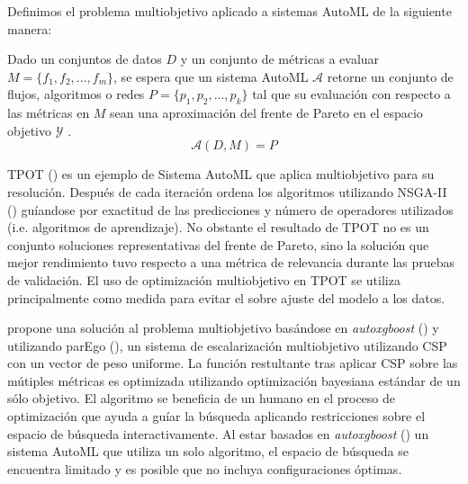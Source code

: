 Definimos el problema multiobjetivo aplicado a sistemas AutoML de la siguiente manera:
\begin{definition}\label{background:def:moo-automl-problem}
    Dado un conjuntos de datos $D$ y  un conjunto de m\'etricas a evaluar $M = \{f_1, f_2, ...,f_m\}$, se espera que  un sistema AutoML $\mathcal{A}$ retorne un conjunto de flujos, algoritmos o redes $P = \{p_1, p_2, ..., p_k\}$ tal que su evaluaci\'on con respecto a las m\'etricas en $M$ sean una aproximaci\'on del frente de Pareto en el espacio objetivo $\mathcal{Y}$ .
    \begin{equation*}
        \mathcal{A}(D, M) = P  
    \end{equation*}
\end{definition}

TPOT (\cite{pmlr-v64-olson_tpot_2016}) es un ejemplo de Sistema AutoML que aplica multiobjetivo para su resoluci\'on. Despu\'es de cada iteraci\'on ordena los algoritmos utilizando NSGA-II (\cite{deb2002fast}) gu\'iandose por exactitud de las predicciones y n\'umero de operadores utilizados (i.e. algoritmos de aprendizaje). No obstante el resultado de TPOT no es un conjunto soluciones representativas del frente de Pareto, sino la soluci\'on que mejor rendimiento tuvo respecto a una m\'etrica de relevancia durante las pruebas de validaci\'on. El uso de optimizaci\'on multiobjetivo en TPOT se utiliza principalmente como medida para evitar el sobre ajuste del modelo a los datos.

\cite{pfisterer2019multi} propone una soluci\'on al problema multiobjetivo bas\'andose en \textit{autoxgboost} (\cite{thomas2018automatic}) y utilizando  parEgo (\cite{knowles2006parego}), un sistema de escalarizaci\'on multiobjetivo utilizando CSP con un vector de peso uniforme. La funci\'on restultante tras aplicar CSP sobre las m\'utiples m\'etricas  es optimizada utilizando optimizaci\'on bayesiana est\'andar de un s\'olo objetivo.
El algoritmo se beneficia de un humano en el proceso de optimizaci\'on que ayuda a gu\'iar la b\'usqueda aplicando restricciones sobre el espacio de b\'usqueda interactivamente.
Al estar basados en \textit{autoxgboost} (\cite{thomas2018automatic}) un sistema AutoML que utiliza un solo algoritmo, el espacio de b\'usqueda se encuentra limitado y es posible que no incluya configuraciones \'optimas.


